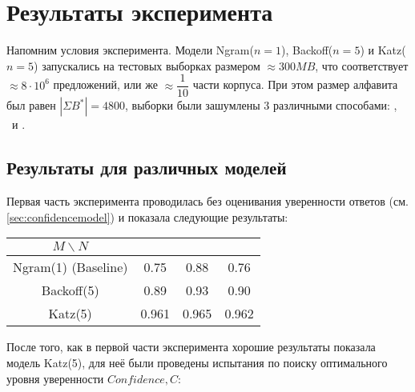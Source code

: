 \section{ Результаты эксперимента }\label{sec:results}

Напомним условия эксперимента. Модели Ngram($n = 1$), Backoff($n = 5$) и Katz($n = 5$) запускались на тестовых выборках размером $\approx 300 MB$, что соответствует $\approx 8 \cdot 10^6$ предложений, или же $\approx \dfrac{1}{10}$ части корпуса. При этом размер алфавита был равен $|\Sigma{B^*}| = 4800$, выборки были зашумлены 3 различными способами: \KG, \BS\ и \MX. 

\subsection{ Результаты для различных моделей }

Первая часть эксперимента проводилась без оценивания уверенности ответов (см. \cref{sec:confidencemodel}) и показала следующие результаты:

\vspace{20pt}

\begin{tabular}{|c|c|c|c|}\hline
	$M \backslash N$ & \KG & \BS & \MX \\ \hline
	Ngram(1) (Baseline) & 0.75 & 0.88 & 0.76 \\
	Backoff(5) & 0.89 & 0.93 & 0.90 \\
	Katz(5) & 0.961 & 0.965 & 0.962 \\ \hline 	
\end{tabular}

\vspace{20pt}


После того, как в первой части эксперимента хорошие результаты показала модель Katz(5), для неё были проведены испытания по поиску оптимального уровня уверенности $Confidence, C$:

\vspace{20pt}

